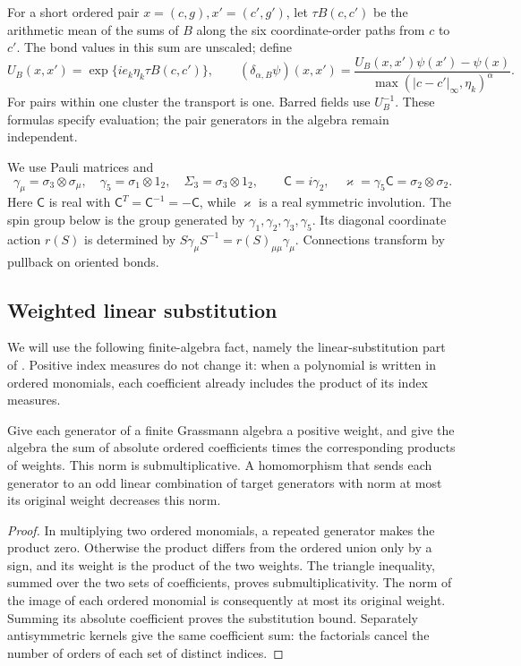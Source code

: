 For a short ordered pair \(x=(c,g),x'=(c',g')\), let
\(\tau B(c,c')\) be the arithmetic mean of the sums of \(B\)
along the six coordinate-order paths from \(c\) to \(c'\).
The bond values in this sum are unscaled; define
\[
 U_B(x,x')=\exp\{ie_k\eta_k\tau B(c,c')\},\qquad
 (\delta_{\alpha,B}\psi)(x,x')
       =\frac{U_B(x,x')\psi(x')-\psi(x)}
                    {\max(|c-c'|_\infty,\eta_k)^\alpha}.
\]
For pairs within one cluster the transport is one. Barred fields
use \(U_B^{-1}\). These formulas specify evaluation; the pair
generators in the algebra remain independent.

We use Pauli matrices and
\[
 \gamma_\mu=\sigma_3\otimes\sigma_\mu,\quad
 \gamma_5=\sigma_1\otimes1_2,\quad \Sigma_3=\sigma_3\otimes1_2,
 \qquad
 \mathsf C=i\gamma_2,\quad
 \varkappa=\gamma_5\mathsf C=\sigma_2\otimes\sigma_2 .
\]
Here \(\mathsf C\) is real with
\(\mathsf C^T=\mathsf C^{-1}=-\mathsf C\), while
\(\varkappa\) is a real symmetric involution. The spin group below
is the group generated by \(\gamma_1,\gamma_2,\gamma_3,\gamma_5\).
Its diagonal coordinate action \(r(S)\) is determined by
\(S\gamma_\mu S^{-1}=r(S)_{\mu\mu}\gamma_\mu\).
Connections transform by pullback on oriented bonds.



\subsection{Weighted linear substitution}

We will use the following finite-algebra fact, namely the
linear-substitution part of
\cite[Proposition~11.4]{QED3Manuscript}. Positive index measures
do not change it: when a polynomial is written in ordered
monomials, each coefficient already includes the product of its
index measures.

\begin{lemma}\label{lem:linear-substitution}
Give each generator of a finite Grassmann algebra a positive
weight, and give the algebra the sum of absolute ordered
coefficients times the corresponding products of weights.
This norm is submultiplicative. A homomorphism that sends each
generator to an odd linear combination of target generators
with norm at most its original weight decreases this norm.
\end{lemma}

\begin{proof}
In multiplying two ordered monomials, a repeated generator makes
the product zero. Otherwise the product differs from the ordered
union only by a sign, and its weight is the product of the two
weights. The triangle inequality, summed over the two sets of
coefficients, proves submultiplicativity. The norm of the image
of each ordered monomial is consequently at most its original
weight. Summing its absolute coefficient proves the
substitution bound. Separately antisymmetric kernels give the
same coefficient sum: the factorials cancel the number of
orders of each set of distinct indices.
\end{proof}
